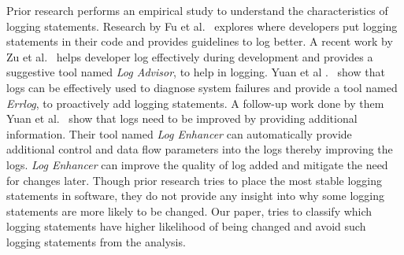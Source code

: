 Prior research performs an empirical study to understand the characteristics of logging statements. Research by Fu {et al$.$}~\cite{Fu1} explores where developers put logging statements in their code and provides guidelines to log better. A recent work by Zu {et al$.$}~\cite{ZhuIcse15} helps developer log effectively during development and provides a suggestive tool named \emph{Log Advisor}, to help in logging. Yuan {et al $.$}~\cite{Yuan_beconservative:} show that logs can be effectively used to diagnose system failures and provide a tool named \emph{Errlog}, to proactively add logging statements. A follow-up work done by them Yuan {et al$ . $}~\cite{Yuan} show that logs need to be improved by providing additional information. Their tool named \emph{Log Enhancer} can automatically provide additional control and data flow parameters into the logs thereby improving the logs. \emph{Log Enhancer} can improve the quality of log added and mitigate the need for changes later. Though prior research tries to place the most stable logging statements in software, they do not provide any insight into why some logging statements are more likely to be changed. Our paper, tries to classify which logging statements have higher likelihood of being changed and avoid such logging statements from the analysis.







